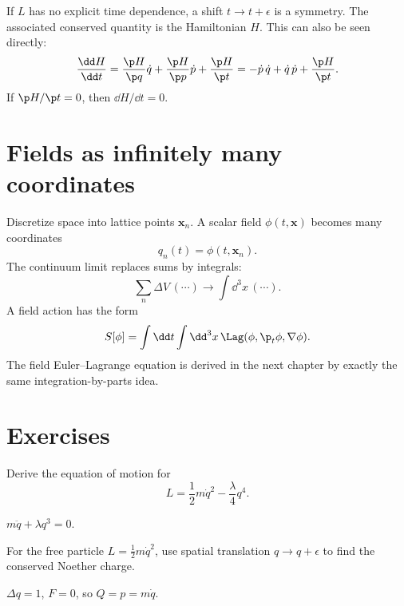 \begin{example}
If \(L\) has no explicit time dependence, a shift \(t\to t+\epsilon\) is a symmetry.  The associated conserved quantity is the Hamiltonian \(H\).  This can also be seen directly:
\[
  \frac{\dd H}{\dd t}
  =
  \frac{\p H}{\p q}\dot q+\frac{\p H}{\p p}\dot p+\frac{\p H}{\p t}
  =
  -\dot p\,\dot q+\dot q\,\dot p+\frac{\p H}{\p t}.
\]
If \(\p H/\p t=0\), then \(\dd H/\dd t=0\).
\end{example}

\section{Fields as infinitely many coordinates}

Discretize space into lattice points \(\bm x_n\).  A scalar field \(\phi(t,\bm x)\) becomes many coordinates
\[
  q_n(t)=\phi(t,\bm x_n).
\]
The continuum limit replaces sums by integrals:
\[
  \sum_n \Delta V\,(\cdots)\to \int\dd^3x\,(\cdots).
\]
A field action has the form
\[
  S[\phi]=\int\dd t\int\dd^3x\,\Lag(\phi,\p_t\phi,\nabla\phi).
\]
The field Euler--Lagrange equation is derived in the next chapter by exactly the same integration-by-parts idea.

\section*{Exercises}

\begin{exercise}
Derive the equation of motion for
\[
  L=\frac12m\dot q^2-\frac{\lambda}{4}q^4.
\]
\begin{answer}
\(m\ddot q+\lambda q^3=0\).
\end{answer}
\end{exercise}

\begin{exercise}
For the free particle \(L=\frac12m\dot q^2\), use spatial translation \(q\to q+\epsilon\) to find the conserved Noether charge.
\begin{answer}
\(\Delta q=1\), \(F=0\), so \(Q=p=m\dot q\).
\end{answer}
\end{exercise}

